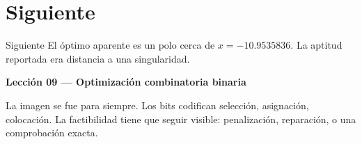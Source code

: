 \section{Siguiente}

\begin{frame}{Siguiente}
El óptimo aparente es un polo cerca de \(x = -10.9535836\). La aptitud reportada era distancia a una singularidad.

\vspace{0.8em}
\textbf{Lección 09 --- Optimización combinatoria binaria}

La imagen se fue para siempre. Los bits codifican selección, asignación, colocación. La factibilidad tiene que seguir visible: penalización, reparación, o una comprobación exacta.
\end{frame}

